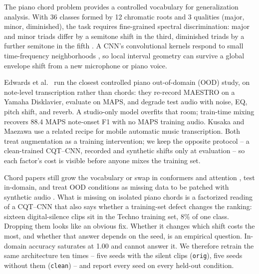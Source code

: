 \documentclass[pdflatex,sn-mathphys-num,iicol]{sn-jnl}
\theoremstyle{thmstyleone}
\theoremstyle{thmstyletwo}
\theoremstyle{thmstylethree}
\begin{document}
The piano chord problem provides a controlled vocabulary for generalization analysis. With 36 classes formed by 12 chromatic roots and 3 qualities (major, minor, diminished), the task requires fine-grained spectral discrimination: major and minor triads differ by a semitone shift in the third, diminished triads by a further semitone in the fifth \cite{Harte2010}. A CNN's convolutional kernels respond to small time-frequency neighborhoods \cite{OShea2015}\cite{Purwono2022}, so local interval geometry can survive a global envelope shift from a new microphone or piano voice.

Edwards et al.\ \cite{Edwards2024} run the closest controlled piano out-of-domain (OOD) study, on note-level transcription rather than chords: they re-record MAESTRO on a Yamaha Disklavier, evaluate on MAPS, and degrade test audio with noise, EQ, pitch shift, and reverb. A studio-only model overfits that room; train-time mixing recovers 88.4 MAPS note-onset F1 with no MAPS training audio. Kusaka and Maezawa \cite{Kusaka2024} use a related recipe for mobile automatic music transcription. Both treat augmentation as a training intervention; we keep the opposite protocol -- a clean-trained CQT--CNN, recorded and synthetic shifts only at evaluation -- so each factor's cost is visible before anyone mixes the training set.

Chord papers still grow the vocabulary \cite{Majchrzak2025} or swap in conformers \cite{Akram2025} and attention \cite{Kusaka2024}, test in-domain, and treat OOD conditions as missing data to be patched with synthetic audio \cite{Byambatsogt2020}\cite{Ostermann2023}. What is missing on isolated piano chords is a factorized reading of a CQT--CNN that also says whether a training-set defect changes the ranking: sixteen digital-silence clips sit in the Techno training set, 8\% of one class. Dropping them looks like an obvious fix. Whether it changes which shift costs the most, and whether that answer depends on the seed, is an empirical question. In-domain accuracy saturates at 1.00 and cannot answer it. We therefore retrain the same architecture ten times -- five seeds with the silent clips (\texttt{orig}), five seeds without them (\texttt{clean}) -- and report every seed on every held-out condition.
\end{document}
